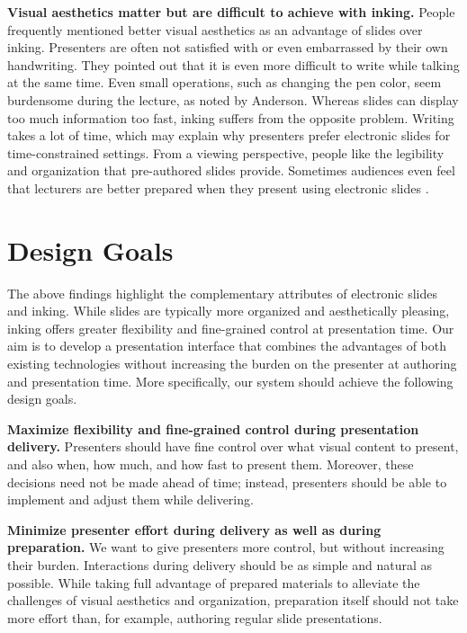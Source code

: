 \textbf{Visual aesthetics matter but are difficult to achieve with inking.} People frequently mentioned better visual aesthetics as an advantage of slides over inking. Presenters are often not satisfied with or even embarrassed by their own handwriting. They pointed out that it is even more difficult to write while talking at the same time. Even small operations, such as changing the pen color, seem burdensome during the lecture, as noted by Anderson\cite{anderson2004study}. Whereas slides can display too much information too fast, inking suffers from the opposite problem. Writing takes a lot of time, which may explain why presenters prefer electronic slides for time-constrained settings. 
%
From a viewing perspective, people like the legibility and organization that pre-authored slides provide. Sometimes audiences even feel that lecturers are better prepared when they present using electronic slides \cite{frey2002learners}. 

\section{Design Goals}

The above findings highlight the complementary attributes of electronic slides and inking. While slides are typically more organized and aesthetically pleasing, inking offers greater flexibility and fine-grained control at presentation time.
%
Our aim is to develop a presentation interface that combines the advantages of both existing technologies without increasing the burden on the presenter at authoring and presentation time.
%
More specifically, our system should achieve the following design goals.


\textbf{Maximize flexibility and fine-grained control during presentation delivery.} Presenters should have fine control over what visual content to present, and also when, how much, and how fast to present them. Moreover, these decisions need not be made ahead of time; instead, presenters should be able to implement and adjust them while delivering.

\textbf{Minimize presenter effort during delivery as well as during preparation.} We want to give presenters more control, but without increasing their burden. Interactions during delivery should be as simple and natural as possible. While taking full advantage of prepared materials to alleviate the challenges of visual aesthetics and organization, preparation itself should not take more effort than, for example, authoring regular slide presentations.



